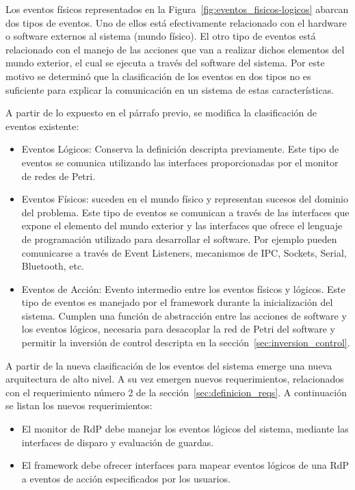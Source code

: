 Los eventos físicos representados en la
Figura~\ref{fig:eventos_fisicos-logicos} abarcan dos tipos de eventos. Uno de
ellos está efectivamente relacionado con el hardware o software externos al
sistema (mundo físico). El otro tipo de eventos está relacionado con el manejo
de las acciones que van a realizar dichos elementos del mundo exterior, el cual
se ejecuta a través del software del sistema.
Por este motivo se determinó que la clasificación de los
eventos en dos tipos no es suficiente para explicar la comunicación en un
sistema de estas características. 

A partir de lo expuesto en el párrafo previo, se modifica la clasificación
de eventos existente:

\begin{itemize}
    \item Eventos Lógicos: Conserva la definición descripta previamente. Este
    tipo de eventos se comunica utilizando las interfaces proporcionadas por el
    monitor de redes de Petri.
    \item Eventos Físicos: suceden en el mundo físico y representan sucesos del
    dominio del problema. Este tipo de eventos se comunican a través de las
    interfaces que expone el elemento del mundo exterior y las interfaces que
    ofrece el lenguaje de programación utilizado para desarrollar el software.
    Por ejemplo pueden comunicarse a través de Event Listeners, mecanismos
    de IPC, Sockets, Serial, Bluetooth, etc.
    \item Eventos de Acción: Evento intermedio
    entre los eventos físicos y lógicos. Este tipo de eventos es manejado
    por el framework durante la inicialización del sistema. Cumplen una función
    de abstracción entre las acciones de software y los eventos lógicos,
    necesaria para desacoplar la red de Petri del software y permitir la
    inversión de control descripta en la sección~\ref{sec:inversion_control}.
\end{itemize}

A partir de la nueva clasificación de los eventos del sistema emerge una nueva
arquitectura de alto nivel. A su vez emergen nuevos requerimientos, relacionados
con el requerimiento número 2 de la sección~\ref{sec:definicion_reqs}. A continuación
se listan los nuevos requerimientos:

\begin{itemize}
  \item El monitor de RdP debe manejar los eventos lógicos del sistema,
  mediante las interfaces de disparo y evaluación de guardas.
  \item El framework debe ofrecer interfaces para mapear eventos lógicos de una
  RdP a eventos de acción especificados por los usuarios.
\end{itemize}

